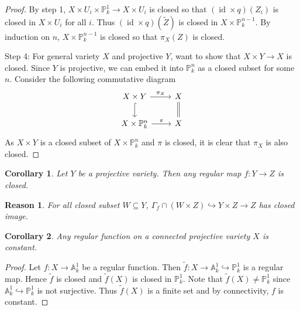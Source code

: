 \documentclass{ctexart}
\newtheorem{reason}{Reason}[section]
\newtheorem{corollary}{Corollary}[section]
\newcommand{\identity}{\operatorname{id}}
\begin{document}
\begin{proof}
    \par
    By step 1, $X \times U_{i} \times \mathbb{P}_{k}^{1} \rightarrow X \times U_{i}$ is closed so that $(\identity \times q)(Z_{i})$ is closed in $X \times U_{i}$ for all $i$.
    Thus $(\identity \times q)(\widetilde{Z})$ is closed in $X \times \mathbb{P}_{k}^{n - 1}$.
    By induction on $n$, $X \times \mathbb{P}_{k}^{n - 1}$ is closed so that $\pi_{X}(Z)$ is closed.
    \par
    Step 4: For general variety $X$ and projective $Y$, want to show that $X \times Y \rightarrow X$ is closed.
    Since $Y$ is projective, we can embed it into $\mathbb{P}_{k}^{n}$ as a closed subset for some $n$.
    Consider the following commutative diagram
    \begin{equation}
        \begin{tikzcd}
            X \times Y \arrow[r, "\pi_{X}"] \arrow[d, hookrightarrow] &
            X \arrow[d, equal] \\
            X \times \mathbb{P}_{k}^{n} \arrow[r, "\pi"] &
            X
        \end{tikzcd}
    \end{equation}
    As $X \times Y$ is a closed subset of $X \times \mathbb{P}_{k}^{n}$ and $\pi$ is closed,
    it is clear that $\pi_{X}$ is also closed.
\end{proof}
\begin{corollary}
    Let $Y$ be a projective variety.
    Then any regular map $f: Y \rightarrow Z$ is closed.
    \label{Corollary 3.1}
\end{corollary}
\begin{reason}
    For all closed subset $W \subseteq Y$, $\Gamma_{f} \cap (W \times Z) \hookrightarrow Y \times Z \rightarrow Z$ has closed image.
\end{reason}
\begin{corollary}
    Any regular function on a connected projective variety $X$ is constant.
    \label{Corollary 3.2}
\end{corollary}
\begin{proof}
    Let $f: X \rightarrow \mathbb{A}_{k}^{1}$ be a regular function.
    Then $\widetilde{f}: X \rightarrow \mathbb{A}_{k}^{1} \hookrightarrow \mathbb{P}_{k}^{1}$ is a regular map.
    Hence $\widetilde{f}$ is closed and $\widetilde{f}(X)$ is closed in $\mathbb{P}_{k}^{1}$.
    Note that $\widetilde{f}(X) \neq \mathbb{P}_{k}^{1}$ since $\mathbb{A}_{k}^{1} \hookrightarrow \mathbb{P}_{k}^{1}$ is not surjective.
    Thus $\widetilde{f}(X)$ is a finite set and by connectivity, $f$ is constant.
\end{proof}
\end{document}
